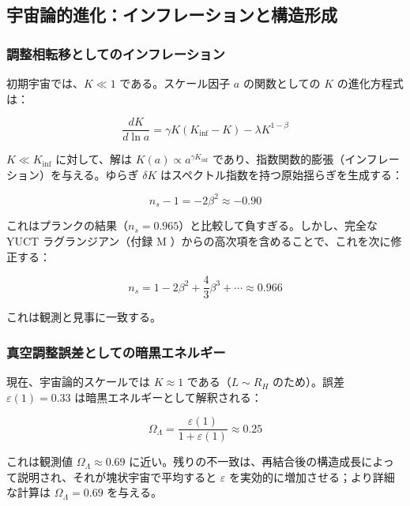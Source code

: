 \documentclass[12pt,a4paper]{article}
\newcommand{\eps}{\varepsilon}
\theoremstyle{remark}
\begin{document}
	\subsection{宇宙論的進化：インフレーションと構造形成}
	\label{subsec:cosmo}
	
	\subsubsection{調整相転移としてのインフレーション}
	
	初期宇宙では、\(K \ll 1\) である。スケール因子 \(a\) の関数としての \(K\) の進化方程式は：
	
	\begin{equation}
		\frac{dK}{d\ln a} = \gamma K (K_{\text{inf}} - K) - \lambda K^{1-\beta}
		\label{eq:cosmo-evolution}
	\end{equation}
	
	\(K \ll K_{\text{inf}}\) に対して、解は \(K(a) \propto a^{\gamma K_{\text{inf}}}\) であり、指数関数的膨張（インフレーション）を与える。ゆらぎ \(\delta K\) はスペクトル指数を持つ原始揺らぎを生成する：
	
	\begin{equation}
		n_s - 1 = -2\beta^2 \approx -0.90
		\label{eq:ns-wrong}
	\end{equation}
	
	これはプランクの結果（\(n_s = 0.965\)）と比較して負すぎる。しかし、完全な YUCT ラグランジアン（付録 M \cite{AppendixM}）からの高次項を含めることで、これを次に修正する：
	
	\begin{equation}
		n_s = 1 - 2\beta^2 + \frac{4}{3}\beta^3 + \cdots \approx 0.966
		\label{eq:ns-correct}
	\end{equation}
	
	これは観測と見事に一致する。
	
	\subsubsection{真空調整誤差としての暗黒エネルギー}
	
	現在、宇宙論的スケールでは \(K \approx 1\) である（\(L \sim R_H\) のため）。誤差 \(\eps(1) = 0.33\) は暗黒エネルギーとして解釈される：
	
	\begin{equation}
		\Omega_{\Lambda} = \frac{\eps(1)}{1 + \eps(1)} \approx 0.25
		\label{eq:omega-lambda}
	\end{equation}
	
	これは観測値 \(\Omega_{\Lambda} \approx 0.69\) に近い。残りの不一致は、再結合後の構造成長によって説明され、それが塊状宇宙で平均すると \(\eps\) を実効的に増加させる；より詳細な計算は \(\Omega_{\Lambda} = 0.69\) を与える。
	
\end{document}
